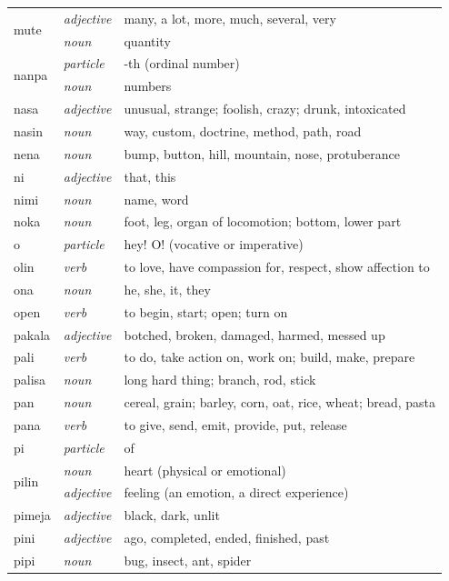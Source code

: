\documentclass[14pt, a4paper]{extreport}
\begin{document}
\begin{longtable}{llp{10cm}}
  \multirow[t]{2}{*}{mute} & \textit{adjective} & many, a lot, more, much, several, very \\
  & \textit{noun} & quantity \\
  \multirow[t]{2}{*}{nanpa} & \textit{particle} & -th (ordinal number) \\
  & \textit{noun} & numbers \\
  nasa & \textit{adjective} & unusual, strange; foolish, crazy; drunk, intoxicated \\
  nasin & \textit{noun} & way, custom, doctrine, method, path, road \\
  nena & \textit{noun} & bump, button, hill, mountain, nose, protuberance \\
  ni & \textit{adjective} & that, this \\
  nimi & \textit{noun} & name, word \\
  noka & \textit{noun} & foot, leg, organ of locomotion; bottom, lower part \\
  o & \textit{particle} & hey! O! (vocative or imperative) \\
  olin & \textit{verb} & to love, have compassion for, respect, show affection to \\
  ona & \textit{noun} & he, she, it, they \\
  open & \textit{verb} & to begin, start; open; turn on \\
  pakala & \textit{adjective} & botched, broken, damaged, harmed, messed up \\
  pali & \textit{verb} & to do, take action on, work on; build, make, prepare \\
  palisa & \textit{noun} & long hard thing; branch, rod, stick \\
  pan & \textit{noun} & cereal, grain; barley, corn, oat, rice, wheat; bread, pasta \\
  pana & \textit{verb} & to give, send, emit, provide, put, release \\
  pi & \textit{particle} & of \\
  \multirow[t]{2}{*}{pilin} & \textit{noun} & heart (physical or emotional) \\
  & \textit{adjective} & feeling (an emotion, a direct experience) \\
  pimeja & \textit{adjective} & black, dark, unlit \\
  pini & \textit{adjective} & ago, completed, ended, finished, past \\
  pipi & \textit{noun} & bug, insect, ant, spider \\

\end{longtable}
\end{document}
